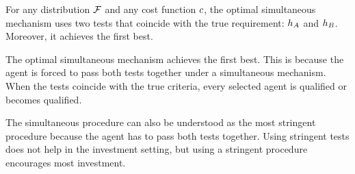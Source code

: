 \begin{proposition}\label{thm:optimal investment}
    For any distribution $\mathcal{F}$ and any cost function $c$, the optimal simultaneous  mechanism uses two tests that coincide with the true requirement: $h_A$ and $h_B$. Moreover, it achieves the first best.
\end{proposition}



The optimal simultaneous mechanism achieves the first best.
This is because the agent is forced to pass both tests together under a simultaneous mechanism.
When the tests coincide with the true criteria, every selected agent is qualified or becomes qualified.

The simultaneous procedure can also be understood as the most stringent procedure because the agent has to pass both tests together.
Using stringent tests does not help in the investment setting, but using a stringent procedure encourages most investment.